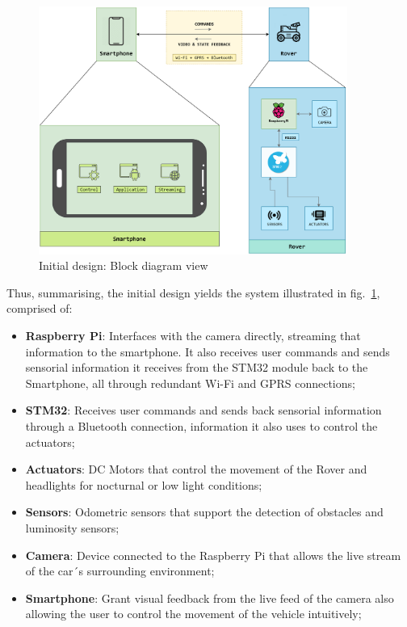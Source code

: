 \begin{figure}[!ht]
\centering
\includegraphics[width=0.9\textwidth]{./sec/img/initial_design_diagram.png}
\caption{\label{fig:initial-design}Initial design: Block diagram view}
\end{figure}

Thus, summarising, the initial design yields the system illustrated in
fig.~\ref{fig:initial-design}, comprised of:

\begin{itemize}
\item \textbf{ Raspberry Pi}: Interfaces with the camera directly, streaming that information to the smartphone. It also receives user commands and sends sensorial information it receives from the STM32 module back to the Smartphone, all through redundant Wi-Fi and GPRS connections;
\item \textbf{STM32}: Receives user commands and sends back sensorial information through a Bluetooth connection, information it also uses to control the actuators;
\item \textbf{Actuators}: DC Motors that control the movement of the Rover and headlights for nocturnal or low light conditions;
\item \textbf{Sensors}: Odometric sensors that support the detection of obstacles and luminosity sensors;
\item \textbf{Camera}: Device connected to the Raspberry Pi that allows the live stream of the car´s surrounding environment;
\item \textbf{Smartphone}: Grant visual feedback from the live feed of the camera also allowing the user to control the movement of the vehicle intuitively;
\end{itemize}

